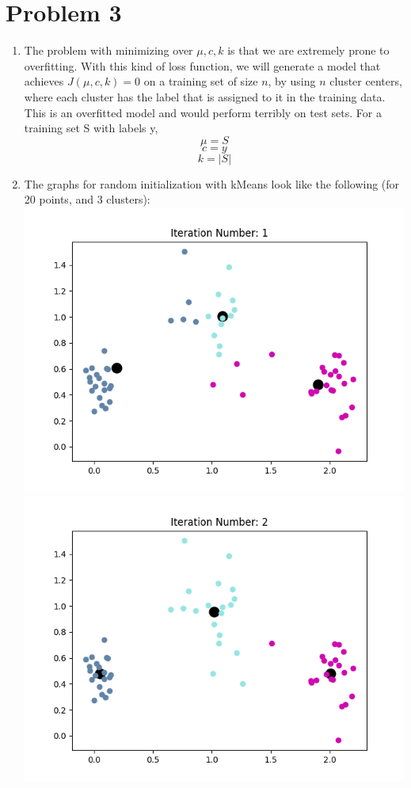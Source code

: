 \documentclass[11pt]{article}
\begin{document}
\newpage
\section{Problem 3}
\begin{enumerate}
\item 
The problem with minimizing over $\mu, c, k$ is that we are extremely prone to overfitting. With this kind of
loss function, we will generate a model that achieves $J(\mu, c, k) = 0$ on a training set of size $n$, by 
using $n$ cluster centers, where each cluster has the label that is assigned to it in the training data. This
is an overfitted model and would perform terribly on test sets. \newline
For a training set S with labels y, \newline
$$\mu = S$$
$$c = y$$
$$k = |S|$$
\setcounter{enumi}{3}
\item 
The graphs for random initialization with kMeans look like the following (for 20 points, and 3 clusters): \newline
\includegraphics[scale=0.4]{means_1.png} 
\includegraphics[scale=0.4]{means_2.png} \newline

\end{enumerate}
\end{document}
